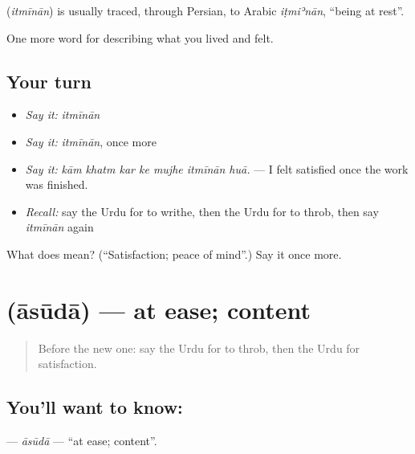 \begin{cousinweb}
\textbf{} (\emph{itmīnān}) is usually traced, through Persian, to Arabic \emph{iṭmiʾnān}, \textquotedblleft{}being at rest\textquotedblright{}.
\end{cousinweb}

\begin{grammarlens}[title={What you've built}]
One more word for describing what you lived and felt.
\end{grammarlens}

\subsection*{Your turn}
\begin{itemize}
\raggedright
  \item \emph{Say it:} \emph{itmīnān}
  \item \emph{Say it:} \emph{itmīnān}, once more
  \item \emph{Say it:} \emph{kām khatm kar ke mujhe itmīnān huā.} — I felt satisfied once the work was finished.
  \item \emph{Recall:} say the Urdu for to writhe, then the Urdu for to throb, then say \emph{itmīnān} again
\end{itemize}

\begin{tcolorbox}[breakable,colback=teal!4,colframe=teal!35!black,title={Before you move on}]
What does  mean? (\textquotedblleft{}Satisfaction; peace of mind\textquotedblright{}.) Say it once more.
\end{tcolorbox}
\section[\texorpdfstring{\ur{آسودہ} (āsūdā)}{آسودہ (āsūdā)}]{ (āsūdā) — at ease; content}

\label{lesson:UR-C447-asuda}



\begin{quote}
Before the new one: say the Urdu for to throb, then the Urdu for satisfaction.
\end{quote}

\subsection*{You'll want to know: }
\textbf{} — \emph{āsūdā} — \textquotedblleft{}at ease; content\textquotedblright{}.

